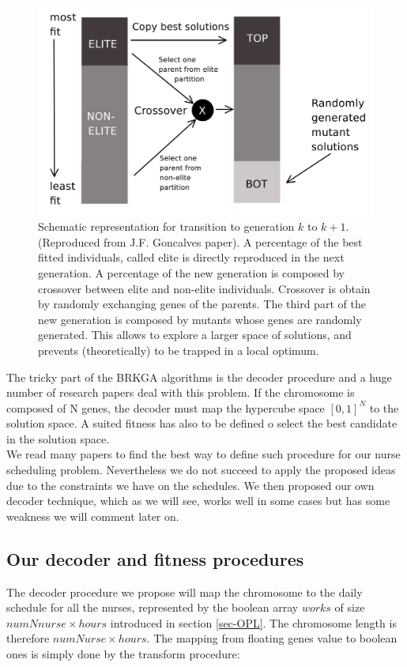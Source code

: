 \documentclass[11pt]{article}
\begin{document}
\begin{figure}[htbp]
\begin{center}
\includegraphics[scale=0.38]{./figBRKGA} 
\end{center}
\caption{Schematic representation for transition to generation $k$ to $k+1$. (Reproduced from J.F. Goncalves paper). A percentage of the best fitted individuals, called elite is directly reproduced in the next generation. A percentage of the new generation is composed by crossover between elite and non-elite individuals. Crossover is obtain by randomly exchanging genes of the parents. The third part of the new generation is composed by mutants whose genes are randomly generated. This allows to explore a larger space of solutions, and prevents (theoretically) to be trapped in a local optimum. }
\label{fig-brkga}
\end{figure}

The tricky part of the BRKGA algorithms is the decoder procedure and a huge number of research papers deal with this problem.
 If the chromosome is composed of N genes, the decoder must map the hypercube space $[0,1]^N$ to the solution space. A suited fitness has also to be defined o select the best candidate in the solution space. \\
 
We read many papers to find the best way to define such procedure for our nurse scheduling problem. Nevertheless we do not succeed to apply the proposed ideas due to the constraints we have on the schedules. We then proposed our own decoder technique, which as we will see, works well in some cases but has some weakness we will comment later on.\\

\subsection{Our decoder and fitness procedures}
The decoder procedure we propose  will map the chromosome  to the daily schedule for all the nurses, represented by the boolean array $works$ of size $numNnurse \times hours$ introduced in section \ref{sec-OPL}. The chromosome length is therefore $numNurse \times hours$. The mapping from floating genes value to boolean ones is simply done by the transform procedure:\\
\end{document}
